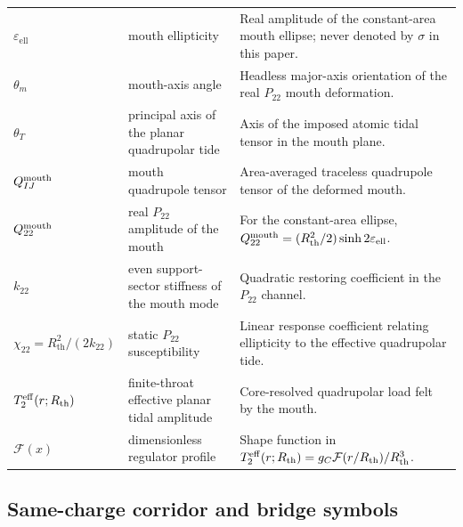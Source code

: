 \documentclass[11pt]{article}
\theoremstyle{plain}
\theoremstyle{definition}
\theoremstyle{remark}
\newcommand{\Ptwotwo}{P_{22}}
\newcommand{\Rth}{R_{\mathrm{th}}}
\newcommand{\epsell}{\varepsilon_{\mathrm{ell}}}
\newcommand{\thmouth}{\theta_m}
\begin{document}
\begin{table}[t]
\begin{tabularx}{\textwidth}{@{}>{\raggedright\arraybackslash}p{} >{\raggedright\arraybackslash}p{} X@{}}
$\epsell$ & mouth ellipticity & Real amplitude of the constant-area mouth ellipse; never denoted by $\sigma$ in this paper. \\
$\thmouth$ & mouth-axis angle & Headless major-axis orientation of the real $\Ptwotwo$ mouth deformation. \\
$\theta_T$ & principal axis of the planar quadrupolar tide & Axis of the imposed atomic tidal tensor in the mouth plane. \\
$Q_{IJ}^{\rm mouth}$ & mouth quadrupole tensor & Area-averaged traceless quadrupole tensor of the deformed mouth. \\
$Q_{22}^{\rm mouth}$ & real $\Ptwotwo$ amplitude of the mouth & For the constant-area ellipse, $Q_{22}^{\rm mouth}=(\Rth^2/2)\sinh 2\epsell$. \\
$k_{22}$ & even support-sector stiffness of the mouth mode & Quadratic restoring coefficient in the $\Ptwotwo$ channel. \\
$\chi_{22}=\Rth^2/(2k_{22})$ & static $\Ptwotwo$ susceptibility & Linear response coefficient relating ellipticity to the effective quadrupolar tide. \\
$T_2^{\rm eff}(r;\Rth)$ & finite-throat effective planar tidal amplitude & Core-resolved quadrupolar load felt by the mouth. \\
$\mathcal F(x)$ & dimensionless regulator profile & Shape function in $T_2^{\rm eff}(r;\Rth)=g_C\mathcal F(r/\Rth)/\Rth^3$. \\
\bottomrule
\end{tabularx}
\end{table}

\subsection{Same-charge corridor and bridge symbols}\label{subsec:notation-ledger-corridor}
\end{document}
